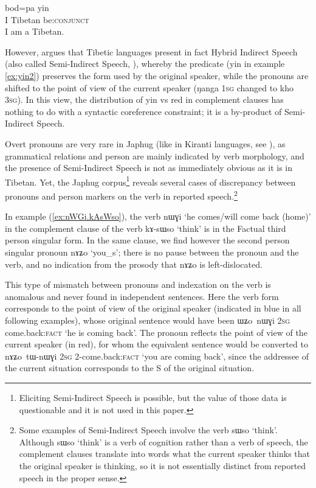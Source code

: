 \documentclass[oldfontcommands,oneside,a4paper,11pt]{article}
\newcommand{\ipa}[1]{{\phon \mbox{#1}}} %
\newcommand{\refb}[1]{(\ref{#1})}
\begin{document}
\begin{exe}
\ex \label{ex:yin3}
\gll     	\ipa{nga} 	\ipa{bod=pa} 	\ipa{yin} 	  \\
I Tibetan be:\textsc{conjunct}    \\
\glt I am a Tibetan.
   \end{exe}
   
However,  \citet{tournadre08conjunct} argues that Tibetic languages present in fact Hybrid Indirect Speech (also called Semi-Indirect Speech, \citealt{aikhenvald08semidirect}), whereby the predicate (\ipa{yin} in example \ref{ex:yin2}) preserves the form used by the original speaker, while the pronouns are shifted to the point of view of the current speaker (\ipa{ŋanga} \textsc{1sg} changed to \ipa{kho} \textsc{3sg}). In this view, the distribution of \ipa{yin} vs \ipa{red} in complement clauses has nothing to do with a syntactic coreference constraint; it is a by-product of Semi-Indirect Speech.

Overt pronouns are very rare in Japhug (like in Kiranti languages, see \citealt{bickel01deictic}), as grammatical relations and person are mainly indicated by verb morphology, and the presence of Semi-Indirect Speech is not as immediately obvious as it is in Tibetan. Yet, the Japhug corpus\footnote{Eliciting Semi-Indirect Speech is possible, but the value of those data is questionable and  it is not used in this paper.} reveals several cases of discrepancy between pronouns and person markers on the verb in reported speech.\footnote{Some examples of Semi-Indirect Speech involve the verb \ipa{sɯso} `think'. Although  \ipa{sɯso} `think' is a verb of cognition rather than a verb of speech, the complement clauses translate into words what the current speaker thinks that the original speaker is thinking, so it is not essentially distinct from reported speech in the proper sense.}


In example \refb{ex:nWGi.kAsWso}, the verb \ipa{nɯɣi} `he comes/will come back (home)' in the complement clause of the verb \ipa{kɤ-sɯso} `think' is in the Factual third person singular form. In the same clause, we find however the second person singular pronoun \ipa{nɤʑo} `you_s'; there is no pause between the pronoun and the verb, and no indication from the prosody that \ipa{nɤʑo} is left-dislocated. 

This type of mismatch  between pronouns and indexation on the verb is anomalous and never found in independent sentences. Here the verb form corresponds to the point of view of the original speaker (indicated in blue in all following examples), whose original sentence would have been \ipa{ɯʑo nɯɣi} \textsc{2sg} {come.back:\textsc{fact}} `he is coming back'. The pronoun reflects the point of view of the current speaker (in red), for whom the equivalent sentence would be converted to \ipa{nɤʑo tɯ-nɯɣi} \textsc{2sg} {2-come.back:\textsc{fact}} `you are coming back', since the addressee of the current situation corresponds to the S of the original situation.
\end{document}
